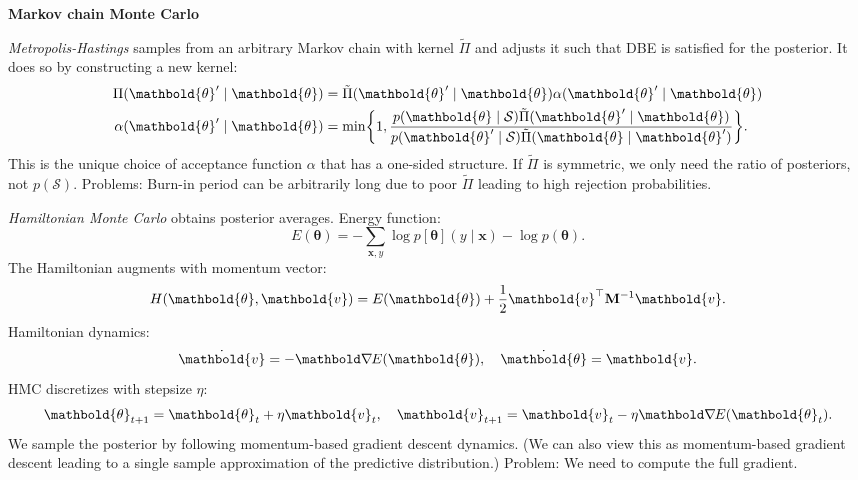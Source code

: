 \documentclass[10pt]{article}
\newenvironment{topic}[1]
{\textbf{\sffamily \footnotesize \colorbox{black}{\rlap{\textbf{\textcolor{white}{#1}}}\hspace{\linewidth}\hspace{-2\fboxsep}}}}
{}
\newenvironment{subtopic}[1]
{\begin{center}\textbf{\footnotesize \sffamily #1}\end{center}}
{}
\renewcommand{\mat}[1]{\ensuremath{\mathbf{#1}}}
\renewcommand{\vec}[1]{\ensuremath{\mathbold{#1}}}
\begin{document}
\begin{multicols*}{3}
\begin{topic}{Bayesian learning}
\begin{subtopic}{Markov chain Monte Carlo}
            \textit{Metropolis-Hastings} samples from an arbitrary Markov chain with kernel $\tilde{\Pi}$ and adjusts it
            such that DBE is satisfied for the posterior. It does so by constructing a new kernel:
            \begin{align*}
                \Pi(\vec{\theta}' \mid \vec{\theta})    & = \tilde{\Pi}(\vec{\theta}' \mid \vec{\theta}) \alpha(\vec{\theta}' \mid \vec{\theta})                                                                                                        \\
                \alpha(\vec{\theta}' \mid \vec{\theta}) & = \min \lft\{ 1, \frac{p(\vec{\theta} \mid \mathcal{S}) \tilde{\Pi}(\vec{\theta}' \mid \vec{\theta})}{p(\vec{\theta}' \mid \mathcal{S}) \tilde{\Pi}(\vec{\theta} \mid \vec{\theta}')} \rgt\}.
            \end{align*}
            This is the unique choice of acceptance function $\alpha$ that has a one-sided structure. If $\tilde{\Pi}$ is
            symmetric, we only need the ratio of posteriors, not $p(\mathcal{S})$. Problems: Burn-in
            period can be arbitrarily long due to poor $\tilde{\Pi}$ leading to high rejection
            probabilities.

            \textit{Hamiltonian Monte Carlo} obtains posterior averages. Energy function: \[
                E(\vec{\theta}) = - \sum_{\vec{x},y} \log p[\vec{\theta}](y \mid \vec{x}) - \log p(\vec{\theta}).
            \]
            The Hamiltonian augments with momentum vector: \[
                H(\vec{\theta}, \vec{v}) = E(\vec{\theta}) + \frac{1}{2} \transpose{\vec{v}} \inv{\mat{M}} \vec{v}.
            \]
            Hamiltonian dynamics: \[
                \dot{\vec{v}} = -\grad{E(\vec{\theta})}{}, \quad \dot{\vec{\theta}} = \vec{v}.
            \]
            HMC discretizes with stepsize $\eta$: \[
                \vec{\theta}_{t+1} = \vec{\theta}_t + \eta \vec{v}_t, \quad \vec{v}_{t+1} = \vec{v}_t - \eta \grad{E(\vec{\theta}_t)}{}.
            \]
            We sample the posterior by following momentum-based gradient descent dynamics. (We can also view
            this as momentum-based gradient descent leading to a single sample approximation of the predictive
            distribution.) Problem: We need to compute the full gradient.


\end{subtopic}
\end{topic}
\end{multicols*}
\end{document}
